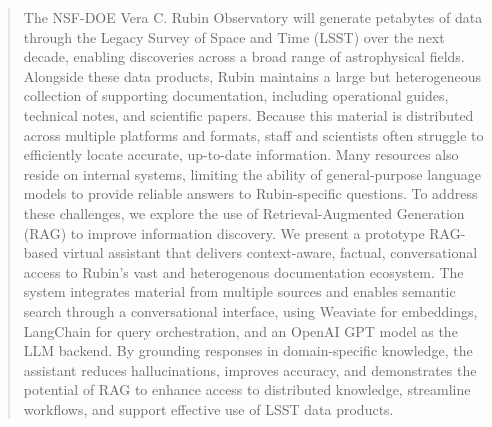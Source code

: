 
\begin{abstract}
The NSF-DOE Vera C. Rubin Observatory will generate petabytes of data through the Legacy Survey of Space and Time (LSST) over the next decade, enabling discoveries across a broad range of astrophysical fields. 
Alongside these data products, Rubin maintains a large but heterogeneous collection of supporting documentation, including operational guides, technical notes, and scientific papers. 
Because this material is distributed across multiple platforms and formats, staff and scientists often struggle to efficiently locate accurate, up-to-date information. 
Many resources also reside on internal systems, limiting the ability of general-purpose language models to provide reliable answers to Rubin-specific questions. 
To address these challenges, we explore the use of Retrieval-Augmented Generation (RAG) to improve information discovery. 
We present a prototype RAG-based virtual assistant that delivers context-aware, factual, conversational access to Rubin’s vast and heterogenous documentation ecosystem. 
The system integrates material from multiple sources and enables semantic search through a conversational interface, using Weaviate for embeddings, LangChain for query orchestration, and an OpenAI GPT model as the LLM backend. 
By grounding responses in domain-specific knowledge, the assistant reduces hallucinations, improves accuracy, and demonstrates the potential of RAG to enhance access to distributed knowledge, streamline workflows, and support effective use of LSST data products.
\end{abstract}

